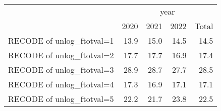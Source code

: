 \begin{tabular}{lllll}
\cline{1-5}
\multicolumn{1}{c}{} &
  \multicolumn{4}{|c}{year} \\
\multicolumn{1}{c}{} &
  \multicolumn{1}{|r}{2020} &
  \multicolumn{1}{r}{2021} &
  \multicolumn{1}{r}{2022} &
  \multicolumn{1}{r}{Total} \\
\cline{1-5}
\multicolumn{1}{l}{RECODE of unlog\_ftotval=1} &
  \multicolumn{1}{|r}{13.9} &
  \multicolumn{1}{r}{15.0} &
  \multicolumn{1}{r}{14.5} &
  \multicolumn{1}{r}{14.5} \\
\multicolumn{1}{l}{RECODE of unlog\_ftotval=2} &
  \multicolumn{1}{|r}{17.7} &
  \multicolumn{1}{r}{17.7} &
  \multicolumn{1}{r}{16.9} &
  \multicolumn{1}{r}{17.4} \\
\multicolumn{1}{l}{RECODE of unlog\_ftotval=3} &
  \multicolumn{1}{|r}{28.9} &
  \multicolumn{1}{r}{28.7} &
  \multicolumn{1}{r}{27.7} &
  \multicolumn{1}{r}{28.5} \\
\multicolumn{1}{l}{RECODE of unlog\_ftotval=4} &
  \multicolumn{1}{|r}{17.3} &
  \multicolumn{1}{r}{16.9} &
  \multicolumn{1}{r}{17.1} &
  \multicolumn{1}{r}{17.1} \\
\multicolumn{1}{l}{RECODE of unlog\_ftotval=5} &
  \multicolumn{1}{|r}{22.2} &
  \multicolumn{1}{r}{21.7} &
  \multicolumn{1}{r}{23.8} &
  \multicolumn{1}{r}{22.5} \\
\cline{1-5}
\end{tabular}
